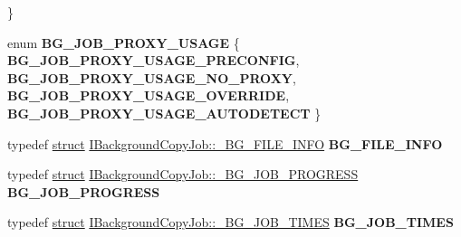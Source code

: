 \begin{DoxyCompactItemize}
 \}
\item 
\mbox{\label{interface_i_background_copy_job_ade8875f7ba7ae60f002674d0b427f717}} 
enum {\bfseries B\+G\+\_\+\+J\+O\+B\+\_\+\+P\+R\+O\+X\+Y\+\_\+\+U\+S\+A\+GE} \{ {\bfseries B\+G\+\_\+\+J\+O\+B\+\_\+\+P\+R\+O\+X\+Y\+\_\+\+U\+S\+A\+G\+E\+\_\+\+P\+R\+E\+C\+O\+N\+F\+IG}, 
{\bfseries B\+G\+\_\+\+J\+O\+B\+\_\+\+P\+R\+O\+X\+Y\+\_\+\+U\+S\+A\+G\+E\+\_\+\+N\+O\+\_\+\+P\+R\+O\+XY}, 
{\bfseries B\+G\+\_\+\+J\+O\+B\+\_\+\+P\+R\+O\+X\+Y\+\_\+\+U\+S\+A\+G\+E\+\_\+\+O\+V\+E\+R\+R\+I\+DE}, 
{\bfseries B\+G\+\_\+\+J\+O\+B\+\_\+\+P\+R\+O\+X\+Y\+\_\+\+U\+S\+A\+G\+E\+\_\+\+A\+U\+T\+O\+D\+E\+T\+E\+CT}
 \}
\item 
\mbox{\label{interface_i_background_copy_job_a00c48c979d8a3fdadb5b825f7c8cf999}} 
typedef \hyperlink{interfacestruct}{struct} \hyperlink{struct_i_background_copy_job_1_1___b_g___f_i_l_e___i_n_f_o}{I\+Background\+Copy\+Job\+::\+\_\+\+B\+G\+\_\+\+F\+I\+L\+E\+\_\+\+I\+N\+FO} {\bfseries B\+G\+\_\+\+F\+I\+L\+E\+\_\+\+I\+N\+FO}
\item 
\mbox{\label{interface_i_background_copy_job_af042f44f49003280b0d2fe5437d90ba9}} 
typedef \hyperlink{interfacestruct}{struct} \hyperlink{struct_i_background_copy_job_1_1___b_g___j_o_b___p_r_o_g_r_e_s_s}{I\+Background\+Copy\+Job\+::\+\_\+\+B\+G\+\_\+\+J\+O\+B\+\_\+\+P\+R\+O\+G\+R\+E\+SS} {\bfseries B\+G\+\_\+\+J\+O\+B\+\_\+\+P\+R\+O\+G\+R\+E\+SS}
\item 
\mbox{\label{interface_i_background_copy_job_a5a2087a19b72a3474e2515d1b7928d85}} 
typedef \hyperlink{interfacestruct}{struct} \hyperlink{struct_i_background_copy_job_1_1___b_g___j_o_b___t_i_m_e_s}{I\+Background\+Copy\+Job\+::\+\_\+\+B\+G\+\_\+\+J\+O\+B\+\_\+\+T\+I\+M\+ES} {\bfseries B\+G\+\_\+\+J\+O\+B\+\_\+\+T\+I\+M\+ES}
\end{DoxyCompactItemize}
